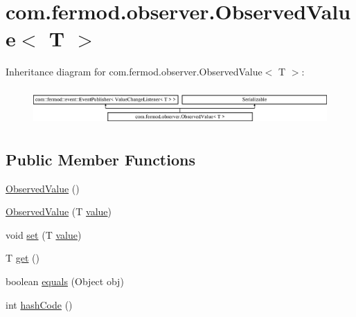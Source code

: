 \hypertarget{classcom_1_1fermod_1_1observer_1_1ObservedValue}{}\section{com.\+fermod.\+observer.\+Observed\+Value$<$ T $>$}
\label{classcom_1_1fermod_1_1observer_1_1ObservedValue}
Inheritance diagram for com.\+fermod.\+observer.\+Observed\+Value$<$ T $>$\+:\begin{figure}[H]
\begin{center}
\leavevmode
\includegraphics[height=1.424936cm]{d8/d55/classcom_1_1fermod_1_1observer_1_1ObservedValue}
\end{center}
\end{figure}
\subsection*{Public Member Functions}
\begin{DoxyCompactItemize}
\item 
\mbox{\hyperlink{classcom_1_1fermod_1_1observer_1_1ObservedValue_a1df366b11a2df10c94ca920c63888417}{Observed\+Value}} ()
\item 
\mbox{\hyperlink{classcom_1_1fermod_1_1observer_1_1ObservedValue_a4707162b16bd900e8ab85b67d45de32f}{Observed\+Value}} (T \mbox{\hyperlink{classcom_1_1fermod_1_1observer_1_1ObservedValue_a947edfec1982817155067f495b0c8cf7}{value}})
\item 
void \mbox{\hyperlink{classcom_1_1fermod_1_1observer_1_1ObservedValue_a40797fd2e2d1fb512ce6be7a35e67af2}{set}} (T \mbox{\hyperlink{classcom_1_1fermod_1_1observer_1_1ObservedValue_a947edfec1982817155067f495b0c8cf7}{value}})
\item 
T \mbox{\hyperlink{classcom_1_1fermod_1_1observer_1_1ObservedValue_aba42362d9ecdba6a831a148d182b6fe6}{get}} ()
\item 
boolean \mbox{\hyperlink{classcom_1_1fermod_1_1observer_1_1ObservedValue_afac1ba1e37eaf9613aefd297af23c979}{equals}} (Object obj)
\item 
int \mbox{\hyperlink{classcom_1_1fermod_1_1observer_1_1ObservedValue_abfd38190483c50e8d07887a273b077a0}{hash\+Code}} ()
\end{DoxyCompactItemize}
